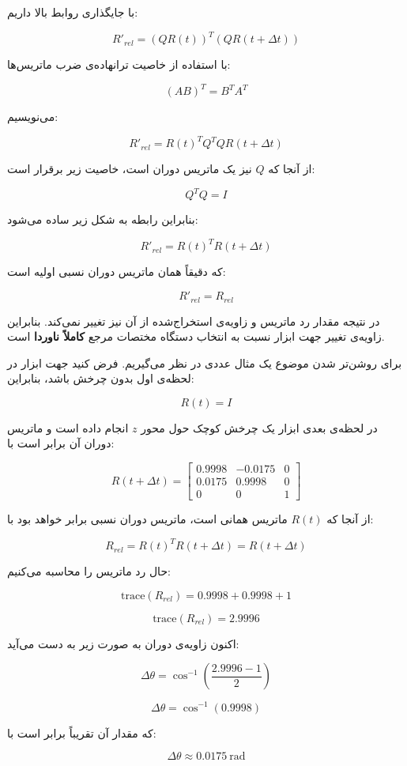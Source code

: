 \documentclass{article}
\begin{document}
با جایگذاری روابط بالا داریم:

\[
R'_{rel} = (Q R(t))^T (Q R(t+\Delta t))
\]

با استفاده از خاصیت ترانهاده‌ی ضرب ماتریس‌ها:

\[
(AB)^T = B^T A^T
\]

می‌نویسیم:

\[
R'_{rel} = R(t)^T Q^T Q R(t+\Delta t)
\]

از آنجا که \(Q\) نیز یک ماتریس دوران است، خاصیت زیر برقرار است:

\[
Q^T Q = I
\]

بنابراین رابطه به شکل زیر ساده می‌شود:

\[
R'_{rel} = R(t)^T R(t+\Delta t)
\]

که دقیقاً همان ماتریس دوران نسبی اولیه است:

\[
R'_{rel} = R_{rel}
\]

در نتیجه مقدار رد ماتریس و زاویه‌ی استخراج‌شده از آن نیز تغییر نمی‌کند. بنابراین زاویه‌ی تغییر جهت ابزار نسبت به انتخاب دستگاه مختصات مرجع \textbf{کاملاً ناوردا} است.

برای روشن‌تر شدن موضوع یک مثال عددی در نظر می‌گیریم. فرض کنید جهت ابزار در لحظه‌ی اول بدون چرخش باشد، بنابراین:

\[
R(t) = I
\]

در لحظه‌ی بعدی ابزار یک چرخش کوچک حول محور \(z\) انجام داده است و ماتریس دوران آن برابر است با:

\[
R(t+\Delta t) =
\begin{bmatrix}
	0.9998 & -0.0175 & 0 \\
	0.0175 & 0.9998 & 0 \\
	0 & 0 & 1
\end{bmatrix}
\]

از آنجا که \(R(t)\) ماتریس همانی است، ماتریس دوران نسبی برابر خواهد بود با:

\[
R_{rel} = R(t)^T R(t+\Delta t) = R(t+\Delta t)
\]

حال رد ماتریس را محاسبه می‌کنیم:

\[
\text{trace}(R_{rel}) =
0.9998 + 0.9998 + 1
\]

\[
\text{trace}(R_{rel}) = 2.9996
\]

اکنون زاویه‌ی دوران به صورت زیر به دست می‌آید:

\[
\Delta\theta =
\cos^{-1}
\left(
\frac{2.9996 - 1}{2}
\right)
\]

\[
\Delta\theta =
\cos^{-1}(0.9998)
\]

که مقدار آن تقریباً برابر است با:

\[
\Delta\theta \approx 0.0175 \ \text{rad}
\]
\end{document}
